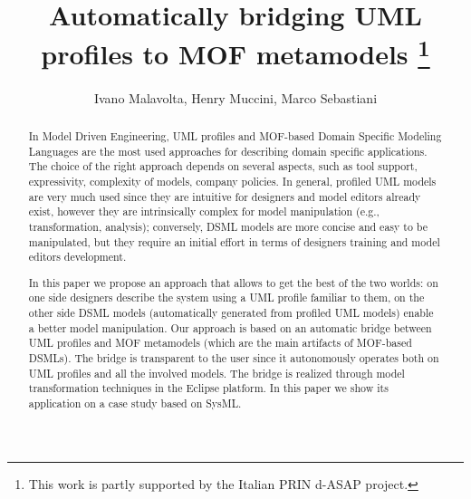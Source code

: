 \documentclass[orivec]{llncs}
\begin{document}
\title{{Automatically bridging UML profiles to MOF metamodels}
\thanks{This work is partly supported by the Italian PRIN d-ASAP project.}}


\author{Ivano Malavolta, Henry Muccini, Marco Sebastiani}

\maketitle

\begin{abstract}
In Model Driven Engineering, UML profiles and MOF-based Domain Specific Modeling Languages are the most used approaches for describing domain specific applications.  
The choice of the right approach depends on several aspects, such as tool support, expressivity, complexity of models, company policies. In general, profiled UML models are very much used since they are intuitive for designers and model editors already exist, however they are intrinsically complex for model manipulation (e.g., transformation, analysis); conversely, DSML models are more concise and easy to be manipulated, but they require an initial effort in terms of designers training and model editors development. 

In this paper we propose an approach that allows to get the best of the two worlds: 
on one side designers describe the system using a UML profile familiar to them, on the other side DSML models (automatically generated from profiled UML models) enable a better model manipulation. Our approach is based on an automatic bridge between UML profiles and MOF metamodels (which are the main artifacts of MOF-based DSMLs). The bridge is transparent to the user since it autonomously operates both on UML profiles 
and all the involved models. The bridge is realized through model transformation techniques in the Eclipse platform. In this paper we show its application on a case study based on SysML.



\end{abstract}
\end{document}
